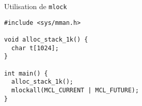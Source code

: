 \begin{frame}[fragile]{Utilisation de \texttt{mlock}}
\begin{lstlisting}
#include <sys/mman.h>

void alloc_stack_1k() {
  char t[1024];
}

int main() {
  alloc_stack_1k();
  mlockall(MCL_CURRENT | MCL_FUTURE);
}
\end{lstlisting} 
\end{frame} 




